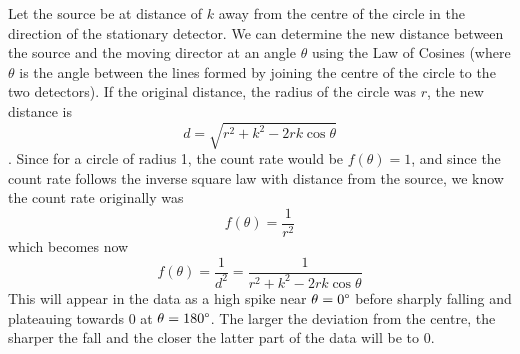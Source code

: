 Let the source be at distance of $k$ away from the centre of the circle in the direction of the stationary detector. We can determine the new distance between the source and the moving director at an angle $\theta$ using the Law of Cosines (where $\theta$ is the angle between the lines formed by joining the centre of the circle to the two detectors). If the original distance, the radius of the circle was $r$, the new distance is
$$d = \sqrt{r^2 + k^2 - 2rk\cos\theta}$$.
Since for a circle of radius 1, the count rate would be $f(\theta) = 1$, and since the count rate follows the inverse square law with distance from the source, we know the count rate originally was
$$f(\theta) = \frac{1}{r^2}$$
which becomes now
$$f(\theta) = \frac{1}{d^2} = \frac{1}{r^2 + k^2 - 2rk\cos\theta}$$
This will appear in the data as a high spike near $\theta=0\degree$ before sharply falling and plateauing towards 0 at $\theta=180\degree$. The larger the deviation from the centre, the sharper the fall and the closer the latter part of the data will be to 0.\\
